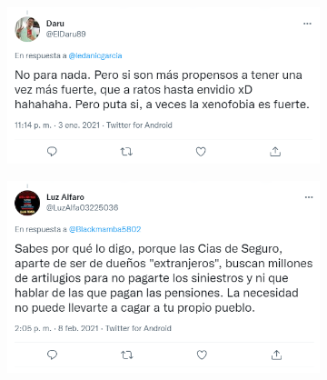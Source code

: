 \begin{figure}[H]
        \centering
            \begin{subfigure}{0.49\textwidth}
                \centering
                \includegraphics[width=.99\linewidth]{figs/tweet_left_1.png}
            \end{subfigure}%
            \begin{subfigure}{0.49\textwidth}
                \centering
                \includegraphics[width=.99\linewidth]{figs/tweet_left_2.png}
            \end{subfigure}
        \hfill
            \begin{subfigure}{0.49\textwidth}
                \centering

\end{subfigure}
\end{figure}
